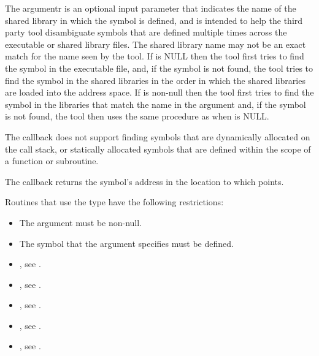 The  argumentr is an optional input parameter that indicates the 
name of the shared library in which the symbol is defined, and is intended to 
help the third party tool disambiguate symbols that are defined multiple times 
across the executable or shared library files. The shared library name may not 
be an exact match for the name seen by the tool. If  is NULL then
the tool first tries to find the symbol in the executable file, and, if the 
symbol is not found, the tool tries to find the symbol in the shared libraries 
in the order in which the shared libraries are loaded into the address space. 
If  is non-null then the tool first tries to find the symbol in 
the libraries that match the name in the  argument and, if the 
symbol is not found, the tool then uses the same procedure as when 
 is NULL.

The callback does not support finding symbols that are dynamically allocated on 
the call stack, or statically allocated symbols that are defined within the scope 
of a function or subroutine.

The callback returns the symbol's address in the location to which
 points.

\restrictions
Routines that use the  type have
the following restrictions:

\begin{itemize}
\item The  argument must be non-null.
\item The symbol that the  argument specifies must be defined. 
\end{itemize}

\crossreferences
\begin{itemize}
\item {}, see .

\item {}, 
see .

\item {}, see .

\item {}, see .

\item {}, see .
\end{itemize}



